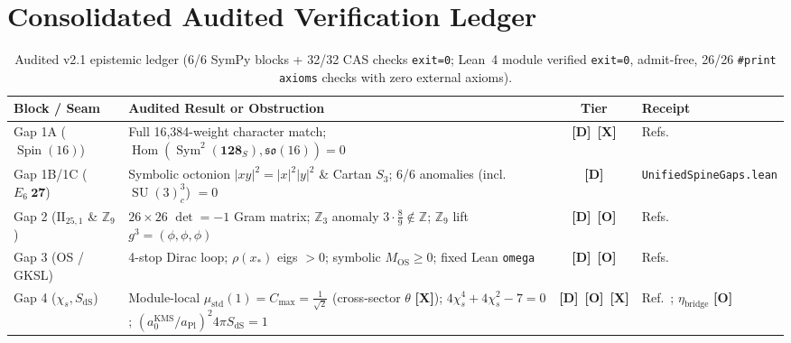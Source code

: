 \documentclass[11pt,a4paper]{article}
\newcommand{\badgeD}{\textbf{\color{sqRose}[D]}}
\newcommand{\badgeO}{\textbf{\color{sqAmber}[O]}}
\newcommand{\badgeX}{\textbf{\color{sqKilled}[X]}}
\theoremstyle{definition}
\begin{document}
\section{Consolidated Audited Verification Ledger}

\begin{table}[!htbp]
\centering
\small
\begin{tabularx}{\linewidth}{@{}l X c l@{}}
\toprule
\textbf{Block / Seam} & \textbf{Audited Result or Obstruction} & \textbf{Tier} & \textbf{Receipt} \\
\midrule
Gap 1A ($\operatorname{Spin}(16)$) & Full 16,384-weight character match; $\operatorname{Hom}(\operatorname{Sym}^2(\mathbf{128}_S),\mathfrak{so}(16))=0$ & \badgeD\ \badgeX & Refs.~\cite{DistlerGaribaldi2010,Kac1977} \\
Gap 1B/1C ($E_6\ \mathbf{27}$) & Symbolic octonion $|xy|^2=|x|^2|y|^2$ \& Cartan $S_3$; 6/6 anomalies (incl.\ $\operatorname{SU}(3)_c^3$) $=0$ & \badgeD & \texttt{UnifiedSpineGaps.lean} \\
Gap 2 ($\mathrm{II}_{25,1}$ \& $\mathbb{Z}_9$) & $26\times 26$ $\det=-1$ Gram matrix; $\mathbb{Z}_3$ anomaly $3\cdot\frac{8}{9}\notin\mathbb{Z}$; $\mathbb{Z}_9$ lift $g^3=(\phi,\phi,\phi)$ & \badgeD\ \badgeO & Refs.~\cite{FLM1988,Borcherds1992} \\
Gap 3 (OS / GKSL) & 4-stop Dirac loop; $\rho(x_*)$ eigs $>0$; symbolic $M_{\mathrm{OS}}\ge 0$; fixed Lean \texttt{omega} & \badgeD\ \badgeO & Refs.~\cite{BisognanoWichmann1975,OsterwalderSchrader1975} \\
Gap 4 ($\chi_s,S_{\mathrm{dS}}$) & Module-local $\mu_{\mathrm{std}}(1)=C_{\max}=\frac{1}{\sqrt{2}}$ (cross-sector $\theta$ \badgeX); $4\chi_s^4+4\chi_s^2-7=0$; $(a_0^{\mathrm{KMS}}/a_{\mathrm{Pl}})^2 4\pi S_{\mathrm{dS}}=1$ & \badgeD\ \badgeO\ \badgeX & Ref.~\cite{SkordisZlosnik2021}; $\eta_{\mathrm{bridge}}$ \badgeO \\
\bottomrule
\end{tabularx}
\caption{Audited v2.1 epistemic ledger (6/6 SymPy blocks + 32/32 CAS checks \texttt{exit=0}; Lean~4 module verified \texttt{exit=0}, admit-free, 26/26 \texttt{\#print axioms} checks with zero external axioms).}
\end{table}
\end{document}

